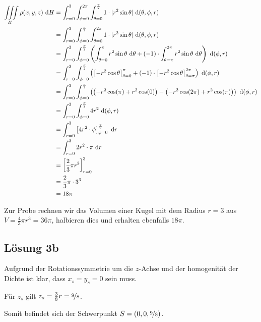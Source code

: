 \documentclass[main.tex]{subfiles}
\begin{document}
\begin{align*}
    \iiint \limits_H \rho(x, y, z) ~\mathrm{d}H
    &=
    \int_{r=0}^{3}
    \int_{\phi=0}^{2\pi}
    \int_{\theta=0}^{\frac{\pi}{2}}
        1 \cdot \lvert r^2\sin\theta\rvert
    ~\mathrm{d}(\theta, \phi, r)\\
    &=
    \int_{r=0}^{3}
    \int_{\phi=0}^{\frac{\pi}{2}}
    \int_{\theta=0}^{2\pi}
        1 \cdot \lvert r^2\sin\theta\rvert
    ~\mathrm{d}(\theta, \phi, r)\\
    &=
    \int_{r=0}^{3}
    \int_{\phi=0}^{\frac{\pi}{2}}
    \left(
        \int_{\theta=0}^{\pi}
            r^2\sin\theta
        ~\mathrm{d}\theta+ (-1) \cdot
        \int_{\theta=\pi}^{2\pi}
            r^2\sin\theta
        ~\mathrm{d}\theta
    \right)
    ~\mathrm{d}(\phi, r)\\
    &=
    \int_{r=0}^{3}
    \int_{\phi=0}^{\frac{\pi}{2}}
    \left(
        \left[
            - r^2 \cos\theta
        \right]_{\theta=0}^{\pi}
        + (-1) \cdot
        \left[
            - r^2 \cos\theta
        \right]_{\theta=\pi}^{2\pi}
    \right)
    ~\mathrm{d}(\phi, r)\\
    &=
    \int_{r=0}^{3}
    \int_{\phi=0}^{\frac{\pi}{2}}
    \left(
        \left(
            - r^2 \cos (\pi)
            + r^2 \cos (0)
        \right)
        -
        \left(
            - r^2 \cos (2\pi)
            + r^2 \cos (\pi)
        \right)
    \right)
    ~\mathrm{d}(\phi, r)\\
    &=
    \int_{r=0}^{3}
    \int_{\phi=0}^{\frac{\pi}{2}}
        4 r^2
    ~\mathrm{d}(\phi, r)\\
    &=
    \int_{r=0}^{3}
    \left[
        4 r^2 \cdot \phi
    \right]_{\phi=0}^{\frac{\pi}{2}}
    ~\mathrm{d}r\\
    &=
    \int_{r=0}^{3}
        2 r^2 \cdot \pi
    ~\mathrm{d}r\\
    &=
    \left[
        \frac{2}{3} \pi r^3
    \right]_{r=0}^{3}\\
    &= \frac{2}{3} \pi\cdot 3^3 \\
    &= 18\pi \\
\end{align*}

Zur Probe rechnen wir das Volumen einer Kugel mit dem Radius $r=3$ aus
$V = \frac{4}{3} \pi r^3 = 36 \pi$, halbieren dies und erhalten ebenfalls $18\pi$.

\subsection{Lösung 3b}
Aufgrund der Rotationssymmetrie um die $z$-Achse und der homogenität der Dichte ist klar, dass $x_s = y_s = 0$ sein muss.

Für $z_s$ gilt $z_s = \frac{3}{8} r = \nicefrac{9}{8}$.

Somit befindet sich der Schwerpunkt $S = (0, 0, \nicefrac{9}{8})$.
\end{document}
